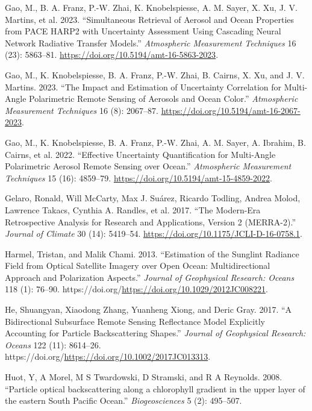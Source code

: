 \documentclass[
  11pt,
  letterpaper,
  DIV=11,
  numbers=noendperiod]{scrreprt}
\newlength{\cslhangindent}
\newenvironment{CSLReferences}[2] %
 {\begin{list}{}{%
  \setlength{\itemindent}{0pt}
  \setlength{\leftmargin}{0pt}
  \setlength{\parsep}{0pt}
  \ifodd #1
   \setlength{\leftmargin}{\cslhangindent}
   \setlength{\itemindent}{-1\cslhangindent}
  \fi
  \setlength{\itemsep}{#2\baselineskip}}}
 {\end{list}}
\begin{document}
\begin{CSLReferences}{1}{0}
Gao, M., B. A. Franz, P.-W. Zhai, K. Knobelspiesse, A. M. Sayer, X. Xu,
J. V. Martins, et al. 2023. {``Simultaneous Retrieval of Aerosol and
Ocean Properties from PACE HARP2 with Uncertainty Assessment Using
Cascading Neural Network Radiative Transfer Models.''} \emph{Atmospheric
Measurement Techniques} 16 (23): 5863--81.
\url{https://doi.org/10.5194/amt-16-5863-2023}.

Gao, M., K. Knobelspiesse, B. A. Franz, P.-W. Zhai, B. Cairns, X. Xu,
and J. V. Martins. 2023. {``The Impact and Estimation of Uncertainty
Correlation for Multi-Angle Polarimetric Remote Sensing of Aerosols and
Ocean Color.''} \emph{Atmospheric Measurement Techniques} 16 (8):
2067--87. \url{https://doi.org/10.5194/amt-16-2067-2023}.

Gao, M., K. Knobelspiesse, B. A. Franz, P.-W. Zhai, A. M. Sayer, A.
Ibrahim, B. Cairns, et al. 2022. {``Effective Uncertainty Quantification
for Multi-Angle Polarimetric Aerosol Remote Sensing over Ocean.''}
\emph{Atmospheric Measurement Techniques} 15 (16): 4859--79.
\url{https://doi.org/10.5194/amt-15-4859-2022}.

Gelaro, Ronald, Will McCarty, Max J. Suárez, Ricardo Todling, Andrea
Molod, Lawrence Takacs, Cynthia A. Randles, et al. 2017. {``The
Modern-Era Retrospective Analysis for Research and Applications, Version
2 (MERRA-2).''} \emph{Journal of Climate} 30 (14): 5419--54.
\url{https://doi.org/10.1175/JCLI-D-16-0758.1}.

Harmel, Tristan, and Malik Chami. 2013. {``Estimation of the Sunglint
Radiance Field from Optical Satellite Imagery over Open Ocean:
Multidirectional Approach and Polarization Aspects.''} \emph{Journal of
Geophysical Research: Oceans} 118 (1): 76--90.
https://doi.org/\url{https://doi.org/10.1029/2012JC008221}.

He, Shuangyan, Xiaodong Zhang, Yuanheng Xiong, and Deric Gray. 2017.
{``A Bidirectional Subsurface Remote Sensing Reflectance Model
Explicitly Accounting for Particle Backscattering Shapes.''}
\emph{Journal of Geophysical Research: Oceans} 122 (11): 8614--26.
https://doi.org/\url{https://doi.org/10.1002/2017JC013313}.

Huot, Y, A Morel, M S Twardowski, D Stramski, and R A Reynolds. 2008.
{``{Particle optical backscattering along a chlorophyll gradient in the
upper layer of the eastern South Pacific Ocean}.''}
\emph{Biogeosciences} 5 (2): 495--507.


\end{CSLReferences}
\end{document}
